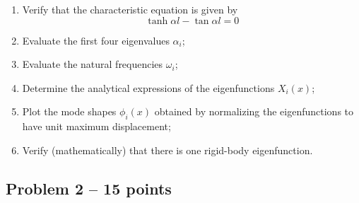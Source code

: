 \documentclass[11pt,a4paper]{article}
\begin{document}
%
\begin{enumerate}
    \item Verify that the characteristic equation is given by
    \begin{equation} \label{p1-e1}
    	\tanh \alpha l - \tan \alpha l = 0
    \end{equation}
    \item Evaluate the first four eigenvalues $\alpha_i$;
    \item Evaluate the natural frequencies $\omega_i$;
    \item Determine the analytical expressions of the eigenfunctions $X_i(x)$; 
    \item Plot the mode shapes $\phi_i(x)$ obtained by normalizing the eigenfunctions to have unit maximum displacement;
    \item Verify (mathematically) that there is one rigid-body eigenfunction.
\end{enumerate} 

\clearpage 

\subsection*{Problem 2 -- 15 points}
\end{document}
